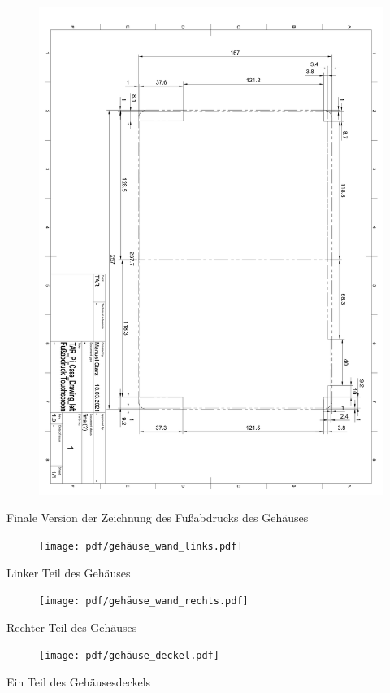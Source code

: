 \begin{figure}[ht!]
	\includegraphics*[width=1\textwidth, page=1]{pdf/gehäuse_zeichnung_fußabdruck_final.pdf}
 	\label{case_footprint_final}
\end{figure}
\begin{center}
Finale Version der Zeichnung des Fußabdrucks des Gehäuses
\end{center}
\newpage
\begin{figure}[ht!]
	\texttt{[image: pdf/gehäuse\_wand\_links.pdf]}
 	\label{case_left}
\end{figure}
\begin{center}
Linker Teil des Gehäuses
\end{center}
\newpage
\begin{figure}[ht!]
	\texttt{[image: pdf/gehäuse\_wand\_rechts.pdf]}
 	\label{case_right}
\end{figure}
\begin{center}
Rechter Teil des Gehäuses
\end{center}
\newpage
\begin{figure}[ht!]
	\texttt{[image: pdf/gehäuse\_deckel.pdf]}
 	\label{case_back}
\end{figure}
\begin{center}
Ein Teil des Gehäusesdeckels
\end{center}
\newpage